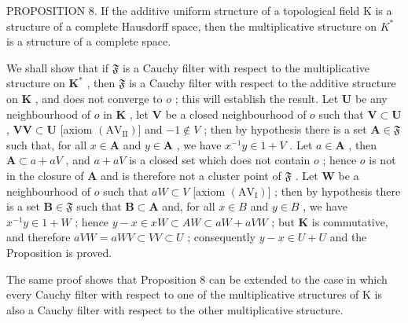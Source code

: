 PROPOSITION 8. If the additive uniform structure of a topological field K is a structure of a complete Hausdorff space, then the multiplicative structure on \(K^{*}\) is a structure of a complete space.

We shall show that if \(\mathfrak{F}\) is a Cauchy filter with respect to the multiplicative structure on \(\mathbf{K}^*\) , then \(\mathfrak{F}\) is a Cauchy filter with respect to the additive structure on \(\mathbf{K}\) , and does not converge to \(o\) ; this will establish the result. Let \(\mathbf{U}\) be any neighbourhood of \(o\) in \(\mathbf{K}\) , let \(\mathbf{V}\) be a closed neighbourhood of \(o\) such that \(\mathbf{V} \subset \mathbf{U}\) , \(\mathbf{VV} \subset \mathbf{U}\) {[}axiom \((\mathrm{AV}_{\mathrm{II}})]\) and \(-1 \notin V\) ; then by hypothesis there is a set \(\mathbf{A} \in \mathfrak{F}\) such that, for all \(x \in \mathbf{A}\) and \(y \in \mathbf{A}\) , we have \(x^{-1}y \in 1 + V\) . Let \(a \in \mathbf{A}\) , then \(\mathbf{A} \subset a + aV\) , and \(a + aV\) is a closed set which does not contain \(o\) ; hence \(o\) is not in the closure of \(\mathbf{A}\) and is therefore not a cluster point of \(\mathfrak{F}\) . Let \(\mathbf{W}\) be a neighbourhood of \(o\) such that \(aW \subset V\) {[}axiom \((\mathrm{AV}_{\mathrm{I}})]\) ; then by hypothesis there is a set \(\mathbf{B} \in \mathfrak{F}\) such that \(\mathbf{B} \subset \mathbf{A}\) and, for all \(x \in B\) and \(y \in B\) , we have \(x^{-1}y \in 1 + W\) ; hence \(y - x \in xW \subset AW \subset aW + aVW\) ; but \(\mathbf{K}\) is commutative, and therefore \(aVW = aWV \subset VV \subset U\) ; consequently \(y - x \in U + U\) and the Proposition is proved.

The same proof shows that Proposition 8 can be extended to the case in which every Cauchy filter with respect to one of the multiplicative structures of K is also a Cauchy filter with respect to the other multiplicative structure.

